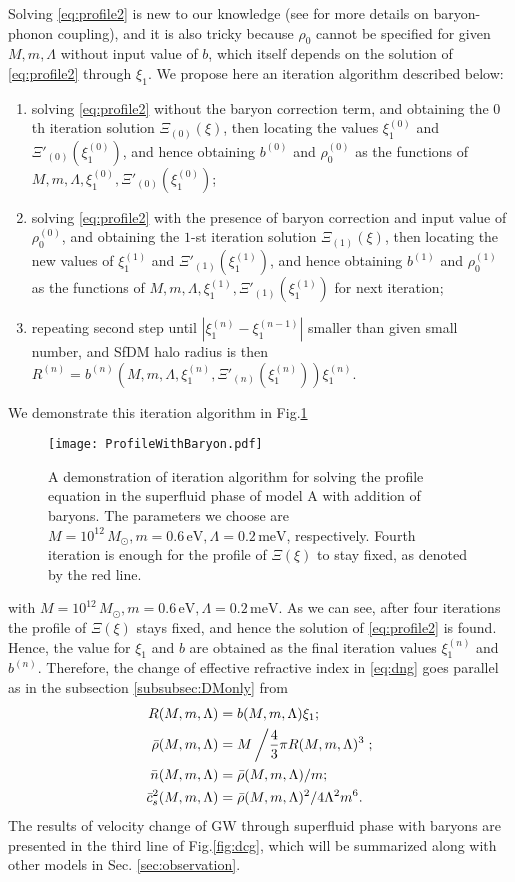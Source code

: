 \documentclass[aps,prd,twocolumn,10pt,groupedaddress]{revtex4-1}
\begin{document}
Solving \eqref{eq:profile2} is new to our knowledge (see \cite{Berezhiani:2017tth} for more details on baryon-phonon coupling), and it is also tricky because $\rho_0$ cannot be specified for given $M, m, \Lambda$ without input value of $b$, which itself depends on the solution of \eqref{eq:profile2} through $\xi_1$. We propose here an iteration algorithm described below:
\begin{enumerate}
  \item solving \eqref{eq:profile2} without the baryon correction term, and obtaining the $0$th iteration solution $\Xi_{(0)}(\xi)$, then locating the values $\xi_1^{(0)}$ and $\Xi'_{(0)}(\xi_1^{(0)})$, and hence obtaining $b^{(0)}$ and $\rho_0^{(0)}$ as the functions of $M, m, \Lambda, \xi_1^{(0)}, \Xi'_{(0)}(\xi_1^{(0)})$;
  \item solving \eqref{eq:profile2} with the presence of baryon correction and input value of $\rho_0^{(0)}$, and obtaining the $1$-st iteration solution $\Xi_{(1)}(\xi)$, then locating the new values of $\xi_1^{(1)}$ and $\Xi'_{(1)}(\xi_1^{(1)})$, and hence obtaining $b^{(1)}$ and $\rho_0^{(1)}$ as the functions of $M, m, \Lambda, \xi_1^{(1)}, \Xi'_{(1)}(\xi_1^{(1)})$ for next iteration;
  \item repeating second step until $|\xi_1^{(n)}-\xi_1^{(n-1)}|$ smaller than given small number, and SfDM halo radius is then  $R^{(n)}=b^{(n)}(M, m, \Lambda, \xi_1^{(n)}, \Xi'_{(n)}(\xi_1^{(n)}))\xi_1^{(n)}$.
\end{enumerate}
We demonstrate this iteration algorithm in Fig.\ref{fig:iteration}
\begin{figure}
  \texttt{[image: ProfileWithBaryon.pdf]}\\
  \caption{A demonstration of iteration algorithm for solving the profile equation in the superfluid phase of model A with addition of baryons. The parameters we choose are $M=10^{12}\,M_\odot, m=0.6\,\mathrm{eV}, \Lambda=0.2\,\mathrm{meV}$, respectively. Fourth iteration is enough for the profile of $\Xi(\xi)$ to stay fixed, as denoted by the red line.}\label{fig:iteration}
\end{figure}
with $M=10^{12}\,M_\odot, m=0.6\,\mathrm{eV}, \Lambda=0.2\,\mathrm{meV}$. As we can see, after four iterations the profile of $\Xi(\xi)$ stays fixed, and hence the solution of \eqref{eq:profile2} is found. Hence, the value for $\xi_1$ and $b$ are obtained as the final iteration values $\xi_1^{(n)}$ and $b^{(n)}$. Therefore, the change of effective refractive index in \eqref{eq:dng} goes parallel as in the subsection \ref{subsubsec:DMonly} from
\begin{align}
R(M,m,\Lambda)&=b(M,m,\Lambda)\xi_1;\\
\bar{\rho}(M,m,\Lambda)&=M\left/\frac43\pi R(M,m,\Lambda)^3\right.;\\
\bar{n}(M,m,\Lambda)&=\bar{\rho}(M,m,\Lambda)/m;\\
\bar{c}_s^2(M,m,\Lambda)&=\bar{\rho}(M,m,\Lambda)^2/4\Lambda^2m^6.
\end{align}
The results of velocity change of GW through superfluid phase with baryons are presented in the third line of Fig.\ref{fig:dcg}, which will be summarized along with other models in Sec. \ref{sec:observation}.
\end{document}
